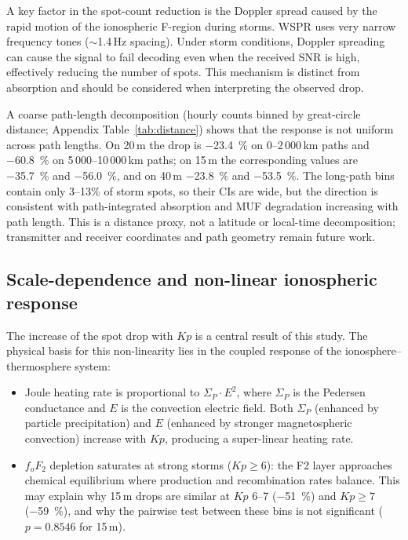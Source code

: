 \documentclass{agujournal2019}
\begin{document}
A key factor in the spot-count reduction is the Doppler spread
caused by the rapid motion of the ionospheric F-region during
storms. WSPR uses very narrow frequency tones ($\sim$1.4\,Hz
spacing). Under storm conditions, Doppler spreading can cause the
signal to fail decoding even when the received SNR is high,
effectively reducing the number of spots. This mechanism is
distinct from absorption and should be considered when
interpreting the observed drop.

A coarse path-length decomposition (hourly counts binned by great-circle
distance; Appendix Table~\ref{tab:distance}) shows that the response is not
uniform across path lengths. On 20\,m the drop is \SI{-23.4}{\percent} on
0--2\,000\,km paths and \SI{-60.8}{\percent} on 5\,000--10\,000\,km paths; on
15\,m the corresponding values are \SI{-35.7}{\percent} and
\SI{-56.0}{\percent}, and on 40\,m \SI{-23.8}{\percent} and
\SI{-53.5}{\percent}. The long-path bins contain only 3--13\% of storm spots,
so their CIs are wide, but the direction is consistent with path-integrated
absorption and MUF degradation increasing with path length. This is a
distance proxy, not a latitude or local-time decomposition; transmitter and
receiver coordinates and path geometry remain future work.

\subsection{Scale-dependence and non-linear ionospheric response}

The increase of the spot drop with $Kp$ is a central result of this study.
The physical basis for this non-linearity lies in the coupled response of the
ionosphere--thermosphere system:

\begin{itemize}
	\item Joule heating rate is proportional to $\Sigma_P \cdot E^2$, where
	      $\Sigma_P$ is the Pedersen conductance and $E$ is the convection
	      electric field. Both $\Sigma_P$ (enhanced by particle precipitation)
	      and $E$ (enhanced by stronger magnetospheric convection) increase with
	      $Kp$, producing a super-linear heating rate.
	\item $f_oF_2$ depletion saturates at strong storms ($Kp \ge 6$): the F2
	      layer approaches chemical equilibrium where production and
	      recombination rates balance. This may explain why 15\,m drops are
	      similar at $Kp$ 6--7 (\SI{-51}{\percent}) and $Kp \ge 7$
	      (\SI{-59}{\percent}), and why the pairwise test between these bins
	      is not significant ($p = 0.8546$ for 15\,m).
\end{itemize}
\end{document}
